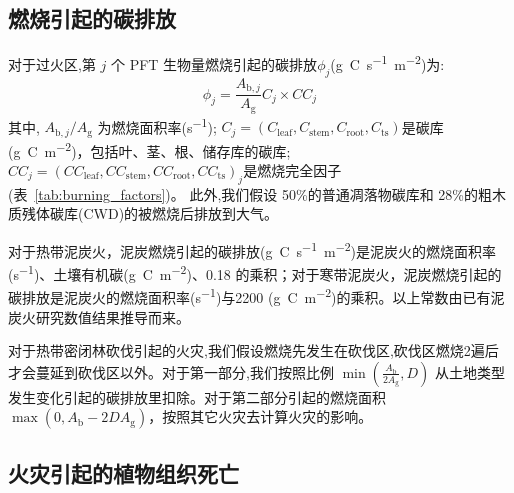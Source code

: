 \subsection{燃烧引起的碳排放}

对于过火区,第 $j$ 个 PFT 生物量燃烧引起的碳排放${\phi}_{j} $(\unit{g.C.s^{-1}.m^{-2}})为:
%
\begin{equation}
  \phi_{j}=\frac{A_{\mathrm{b},j}}{A_{\mathrm{g}}} C_{j} \times C C_{j}
\end{equation}
%
其中, $A_{\mathrm{b},j}/A_{\mathrm {g}} $ 为燃烧面积率(\unit{s^{-1}}); $
C_{j}=\left(C_{\mathrm{leaf}}, C_{\mathrm{stem}}, C_{\mathrm{root}}, C_{\mathrm{t s}}\right)
$是碳库(\unit{g.C.m^{-2}})，包括叶、茎、根、储存库的碳库; $
C C_{j}=\left(C C_{\mathrm{leaf}}, C C_{\mathrm{stem}}, C C_{\mathrm{root}}, C C_{\mathrm{t s}}\right)_{j}
$是燃烧完全因子 (表~\ref{tab:burning_factors})。 此外,我们假设 50\%的普通凋落物碳库和 28\%的粗木质残体碳库(CWD)的被燃烧后排放到大气。


对于热带泥炭火，泥炭燃烧引起的碳排放(\unit{g.C.s^{-1}.m^{-2}})是泥炭火的燃烧面积率(\unit{s^{-1}})、土壤有机碳(\unit{g.C.m^{-2}})、0.18 的乘积；对于寒带泥炭火，泥炭燃烧引起的碳排放是泥炭火的燃烧面积率(\unit{s^{-1}})与2200 (\unit{g.C.m^{-2}})的乘积。以上常数由已有泥炭火研究数值结果推导而来。

对于热带密闭林砍伐引起的火灾,我们假设燃烧先发生在砍伐区,砍伐区燃烧2遍后才会蔓延到砍伐区以外。对于第一部分,我们按照比例 $\min \left(\frac{A_{\mathrm{b}}}{2 A_{\mathrm{g}}}, D\right)$ 从土地类型发生变化引起的碳排放里扣除。对于第二部分引起的燃烧面积 $\max(0, A_{\mathrm {b}} -2DA_{\mathrm {g}} )$，按照其它火灾去计算火灾的影响。


\subsection{火灾引起的植物组织死亡}

